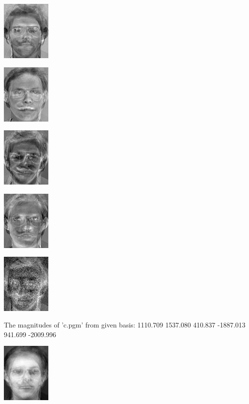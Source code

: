 \documentclass[a4paper]{article}
\begin{document}
\includegraphics[scale=0.500000]{NewPrincComp1.jpg}

\includegraphics[scale=0.500000]{NewPrincComp2.jpg}

\includegraphics[scale=0.500000]{NewPrincComp3.jpg}

\includegraphics[scale=0.500000]{NewPrincComp4.jpg}

\includegraphics[scale=0.500000]{NewPrincComp5.jpg}

The magnitudes of 'c.pgm' from given basis:
1110.709 1537.080 410.837 -1887.013 941.699 -2009.996

\includegraphics[scale=0.500000]{NewPartRecon0.jpg}
\end{document}
